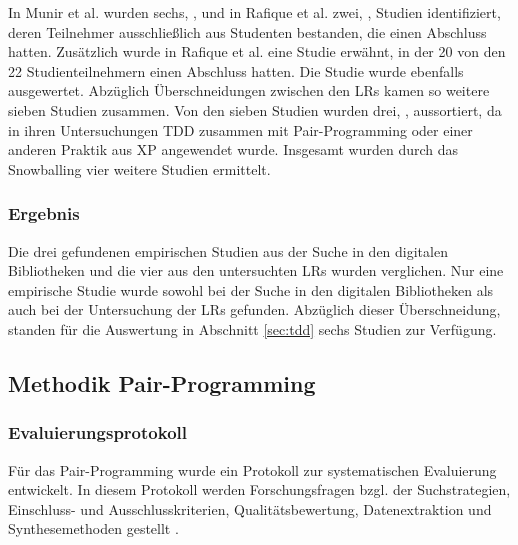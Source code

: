 In Munir et al. \cite{Munir2014ConsideringReview} wurden sechs, \cite{Madeyski2010TheExperiment,Madeyski2005PreliminaryQuality,Gupta2007AnDevelopment,Muller2002ExperimentProgramming,Flohr2006LessonsTeachings,Flohr2005AnProblems}, und in Rafique et al. \cite{Rafique2013TheMeta-Analysis} zwei, \cite{Muller2002ExperimentProgramming,Flohr2006LessonsTeachings}, Studien identifiziert, deren Teilnehmer ausschließlich aus Studenten bestanden, die einen Abschluss hatten. Zusätzlich wurde in Rafique et al. \cite{Rafique2013TheMeta-Analysis} eine Studie \cite{Gupta2007AnDevelopment} erwähnt, in der 20 von den 22 Studienteilnehmern einen Abschluss hatten. Die Studie wurde ebenfalls ausgewertet. Abzüglich Überschneidungen zwischen den LRs kamen so weitere sieben Studien zusammen. Von den sieben Studien wurden drei, \cite{Flohr2006LessonsTeachings,Flohr2005AnProblems,Muller2001CaseEnvironment}, aussortiert, da in ihren Untersuchungen TDD zusammen mit Pair-Programming oder einer anderen Praktik aus XP angewendet wurde. Insgesamt wurden durch das Snowballing vier weitere Studien ermittelt.

\subsubsection{Ergebnis} Die drei gefundenen empirischen Studien aus der Suche in den digitalen Bibliotheken und die vier aus den untersuchten LRs wurden verglichen. Nur eine empirische Studie wurde sowohl bei der Suche in den digitalen Bibliotheken als auch bei der Untersuchung der LRs gefunden. Abzüglich dieser Überschneidung, standen für die Auswertung in Abschnitt \ref{sec:tdd} sechs Studien zur Verfügung.%

\subsection{Methodik Pair-Programming}

\subsubsection{Evaluierungsprotokoll} Für das Pair-Programming wurde ein Protokoll zur systematischen Evaluierung entwickelt. In diesem Protokoll werden Forschungsfragen bzgl. der Suchstrategien, Einschluss- und Ausschlusskriterien, Qualitätsbewertung, Datenextraktion und Synthesemethoden gestellt \cite{Kitchenham2007GuidelinesEngineering,Higgins2008Cochrane}.

